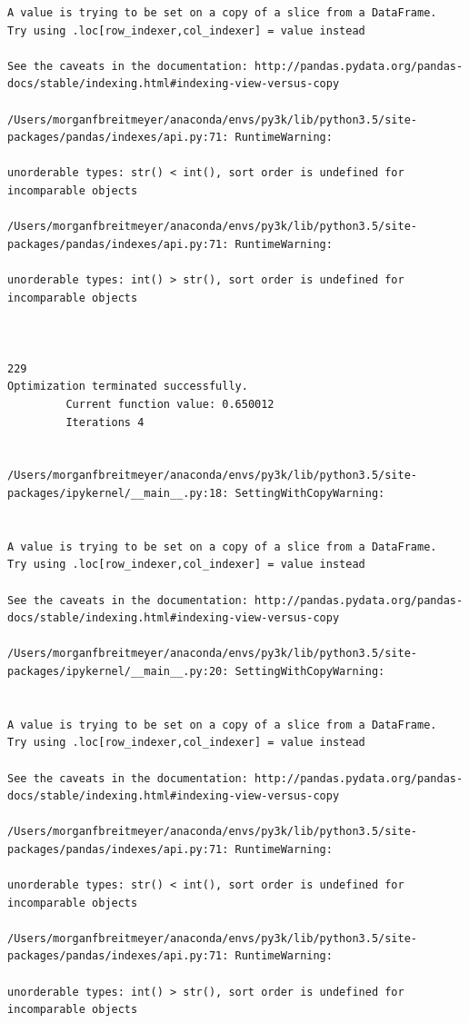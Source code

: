 \begin{lstlisting}
A value is trying to be set on a copy of a slice from a DataFrame.
Try using .loc[row_indexer,col_indexer] = value instead

See the caveats in the documentation: http://pandas.pydata.org/pandas-docs/stable/indexing.html#indexing-view-versus-copy

/Users/morganfbreitmeyer/anaconda/envs/py3k/lib/python3.5/site-packages/pandas/indexes/api.py:71: RuntimeWarning:

unorderable types: str() < int(), sort order is undefined for incomparable objects

/Users/morganfbreitmeyer/anaconda/envs/py3k/lib/python3.5/site-packages/pandas/indexes/api.py:71: RuntimeWarning:

unorderable types: int() > str(), sort order is undefined for incomparable objects



229
Optimization terminated successfully.
         Current function value: 0.650012
         Iterations 4


/Users/morganfbreitmeyer/anaconda/envs/py3k/lib/python3.5/site-packages/ipykernel/__main__.py:18: SettingWithCopyWarning:


A value is trying to be set on a copy of a slice from a DataFrame.
Try using .loc[row_indexer,col_indexer] = value instead

See the caveats in the documentation: http://pandas.pydata.org/pandas-docs/stable/indexing.html#indexing-view-versus-copy

/Users/morganfbreitmeyer/anaconda/envs/py3k/lib/python3.5/site-packages/ipykernel/__main__.py:20: SettingWithCopyWarning:


A value is trying to be set on a copy of a slice from a DataFrame.
Try using .loc[row_indexer,col_indexer] = value instead

See the caveats in the documentation: http://pandas.pydata.org/pandas-docs/stable/indexing.html#indexing-view-versus-copy

/Users/morganfbreitmeyer/anaconda/envs/py3k/lib/python3.5/site-packages/pandas/indexes/api.py:71: RuntimeWarning:

unorderable types: str() < int(), sort order is undefined for incomparable objects

/Users/morganfbreitmeyer/anaconda/envs/py3k/lib/python3.5/site-packages/pandas/indexes/api.py:71: RuntimeWarning:

unorderable types: int() > str(), sort order is undefined for incomparable objects




\end{lstlisting}
